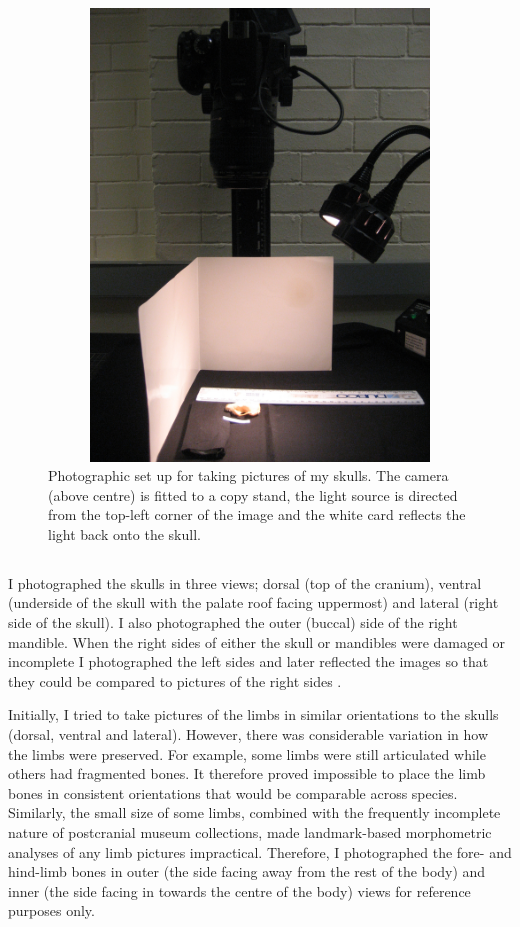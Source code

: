 \begin{figure}[h] 
  \centering
  \includegraphics[width=12cm, height=12cm, keepaspectratio=true]{Methods/figures/camera.jpg}
    \caption[Photographic set up]
    {Photographic set up for taking pictures of my skulls. The camera (above centre) is fitted to a copy stand, the light source is directed from the top-left corner of the image and the white card reflects the light back onto the skull. }%
  \label{fig:camera}
  \end{figure}

\subsection{}
	I photographed the skulls in three views; dorsal (top of the cranium), ventral (underside of the skull with the palate roof facing uppermost) and lateral (right side of the skull). I also photographed the outer (buccal) side of the right mandible. When the right sides of either the skull or mandibles were damaged or incomplete I photographed the left sides and later reflected the images so that they could be compared to pictures of the right sides \citep[e.g.][]{Barrow2008}.

	Initially, I tried to take pictures of the limbs in similar orientations to the skulls (dorsal, ventral and lateral). However, there was considerable variation in how the limbs were preserved. For example, some limbs were still articulated while others had fragmented bones. It therefore proved impossible to place the limb bones in consistent orientations that would be comparable across species. Similarly, the small size of some limbs, combined with the frequently incomplete nature of postcranial museum collections, made landmark-based morphometric analyses of any limb pictures impractical. Therefore, I photographed the fore- and hind-limb bones in outer (the side facing away from the rest of the body) and inner (the side facing in towards the centre of the body) views for reference purposes only.


